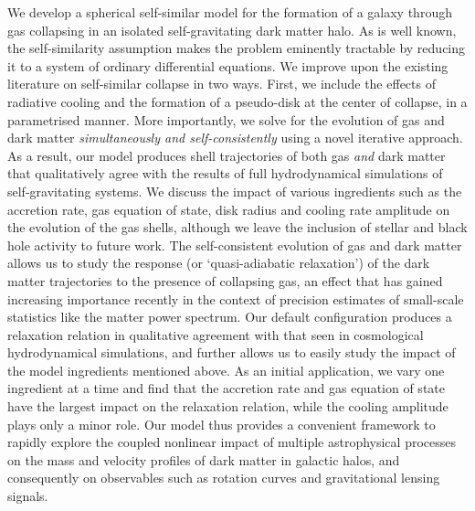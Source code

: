 \documentclass[a4paper, 12pt, oneside]{Thesis}  %
\begin{document}
{We develop a spherical self-similar model for the formation of a galaxy through gas collapsing in an isolated self-gravitating dark matter halo. As is well known, the self-similarity assumption makes the problem eminently tractable by reducing it to a system of ordinary differential equations. We improve upon the existing literature on self-similar collapse in two ways. First, we include the effects of radiative cooling and the formation of a pseudo-disk at the center of collapse, in a parametrised manner. More importantly, we solve for the evolution of gas and dark matter \emph{simultaneously and self-consistently} using a novel iterative approach. As a result, our model produces shell trajectories of both gas \emph{and} dark matter that qualitatively agree with the results of full hydrodynamical simulations of self-gravitating systems. We discuss the impact of various ingredients such as the accretion rate, gas equation of state, disk radius and cooling rate amplitude on the evolution of the gas shells, although we leave the inclusion of stellar and black hole activity to future work. The self-consistent evolution of gas and dark matter allows us to study the response (or `quasi-adiabatic relaxation') of the dark matter trajectories to the presence of collapsing gas, an effect that has gained increasing importance recently in the context of precision estimates of small-scale statistics like the matter power spectrum. Our default configuration produces a relaxation relation in qualitative agreement with that seen in cosmological hydrodynamical simulations, and further allows us to easily study the impact of the model ingredients mentioned above. As an initial application, we vary one ingredient at a time and find that the accretion rate and gas equation of state have the largest impact on the relaxation relation, while the cooling amplitude plays only a minor role. Our model thus provides a convenient framework to rapidly explore the coupled nonlinear impact of multiple astrophysical processes on the mass and velocity profiles of dark matter in galactic halos, and consequently on observables such as rotation curves and gravitational lensing signals.

}

\clearpage  %


\clearpage  %
\end{document}
